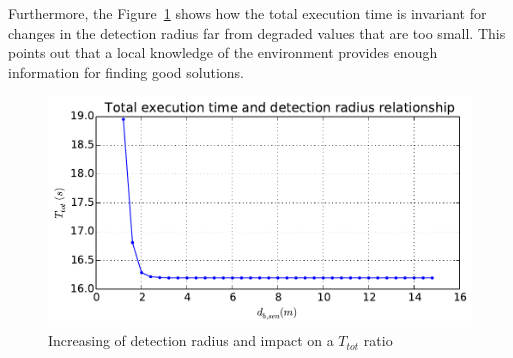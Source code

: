 \documentclass[eprint]{actapoly}
\begin{document}
Furthermore, the Figure~\ref{fig:drhotot} shows how the total execution time
is invariant for changes in the detection radius far from degraded values that are too small.
This points out that a local knowledge of the environment provides enough information for finding good solutions.
\begin{figure}[!h]\centering
  \includegraphics[width=\linewidth]{./images/drho/drho-tot.pdf}
  \caption{Increasing of detection radius and impact on a $T_{tot}$ 
ratio\label{fig:drhotot}}
\end{figure}

%
%
%
\end{document}
